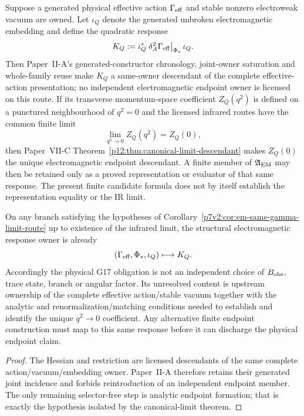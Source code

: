 \documentclass[12pt,a4paper]{article}
\begin{document}
\begin{corollary}
\label{p7v2:cor:em-same-gamma-limit-route}
Suppose a generated physical effective action $\Gamma_{\rm eff}$ and stable
nonzero electroweak vacuum are owned.  Let $\iota_Q$ denote the generated
unbroken electromagnetic embedding and define the quadratic response
\[
 K_Q:=\iota_Q^*\left.\delta_A^2\Gamma_{\rm eff}\right|_{\Phi_*}\iota_Q.
\]
Then Paper~II-A's generated-constructor chronology, joint-owner saturation and
whole-family reuse make $K_Q$ a same-owner descendant of the complete
effective-action presentation; no independent electromagnetic endpoint owner
is licensed on this route.  If its transverse momentum-space coefficient
$Z_Q(q^2)$ is defined on a punctured neighbourhood of $q^2=0$ and the licensed
infrared routes have the common finite limit
\[
 \lim_{q^2\to0}Z_Q(q^2)=Z_Q(0),
\]
then Paper~VII-C Theorem~\ref{p12:thm:canonical-limit-descendant} makes
$Z_Q(0)$ the unique electromagnetic endpoint descendant.  A finite member of
$\mathfrak A_{\rm EM}$ may then be retained only as a proved representation or
evaluator of that same response.  The present finite candidate formula does
not by itself establish the representation equality or the IR limit.
\end{corollary}

\begin{theorem}
\label{p7v2:thm:em-owner-contraction}
On any branch satisfying the hypotheses of
Corollary~\ref{p7v2:cor:em-same-gamma-limit-route} up to existence of the
infrared limit, the structural electromagnetic response owner is already
\[
 (\Gamma_{\rm eff},\Phi_*,\iota_Q)\longmapsto K_Q.
\]
Accordingly the physical G17 obligation is not an independent choice of
$B_{\rm obs}$, trace state, branch or angular factor.  Its unresolved content
is upstream ownership of the complete effective action/stable vacuum together
with the analytic and renormalization/matching conditions needed to establish
and identify the unique $q^2\to0$ coefficient.  Any alternative finite
endpoint construction must map to this same response before it can discharge
the physical endpoint claim.
\end{theorem}

\begin{proof}
The Hessian and restriction are licensed descendants of the same complete
action/vacuum/embedding owner.  Paper~II-A therefore retains their generated
joint incidence and forbids reintroduction of an independent endpoint member.
The only remaining selector-free step is analytic endpoint formation; that is
exactly the hypothesis isolated by the canonical-limit theorem.
\end{proof}
\end{document}

